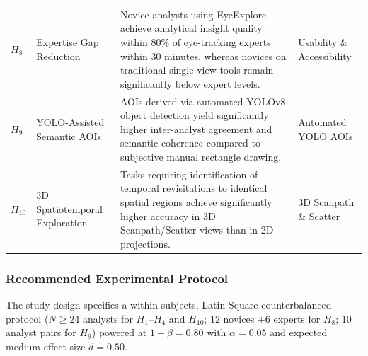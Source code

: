 \documentclass[11pt,a4paper]{article}
\begin{document}
\begin{table}[H]
\begin{tabularx}{\linewidth}{l p{3.2cm} X l}
        \textbf{$H_8$} & Expertise Gap Reduction & Novice analysts using EyeExplore achieve analytical insight quality within $80\%$ of eye-tracking experts within 30 minutes, whereas novices on traditional single-view tools remain significantly below expert levels. & Usability \& Accessibility \\
        \textbf{$H_9$} & YOLO-Assisted Semantic AOIs & AOIs derived via automated YOLOv8 object detection yield significantly higher inter-analyst agreement and semantic coherence compared to subjective manual rectangle drawing. & Automated YOLO AOIs \\
        \textbf{$H_{10}$} & 3D Spatiotemporal Exploration & Tasks requiring identification of temporal revisitations to identical spatial regions achieve significantly higher accuracy in 3D Scanpath/Scatter views than in 2D projections. & 3D Scanpath \& Scatter \\
        \bottomrule
    \end{tabularx}
\end{table}

\subsubsection{Recommended Experimental Protocol}
The study design specifies a within-subjects, Latin Square counterbalanced protocol ($N \ge 24$ analysts for $H_1\text{--}H_4$ and $H_{10}$; $12$ novices $+ 6$ experts for $H_8$; $10$ analyst pairs for $H_9$) powered at $1-\beta = 0.80$ with $\alpha = 0.05$ and expected medium effect size $d = 0.50$.
\end{document}
